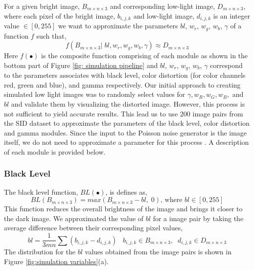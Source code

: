 \documentclass{article}
\begin{document}
For a given bright image, $B_{m\times n\times 3}$ and corresponding low-light image, $D_{m\times n \times 3}$, where each pixel of the bright image, $b_{i, j, k}$ and low-light image, $d_{i, j, k}$ is an integer value $\in [0, 255]$ we want to approximate the parameters $bl$, $w_r$, $w_g$, $w_b$, $\gamma$ of a function $f$ such that, 
$$f(B_{m\times n\times 3} |\; bl, w_r, w_g, w_b, \gamma) \approx D_{m\times n\times 3}$$
Here $f(\bullet)$ is the composite function comprising of each module as shown in the bottom part of Figure \ref{fig: simulation pipeline} and $bl$, $w_r$, $w_g$, $w_b$, $\gamma$ correspond to the parameters associates with black level, color distortion (for color channels red, green and blue), and gamma respectively. Our initial approach to creating simulated low light images was to randomly select values for \(\gamma, w_{R}, w_{G}, w_{B},\) and \(bl\) and validate them by visualizing the distorted image. However, this process is not sufficient to yield accurate results. This lead us to use 200 image pairs from the SID dataset to approximate the parameters of the black level, color distortion and gamma modules. Since the input to the Poisson noise generator is the image itself, we do not need to approximate a parameter for this process \cite{remez2017deep}. A description of each module is provided below. 

\subsubsection{Black Level}
The black level function, $BL(\bullet)$, is defines as, 
$$BL(B_{m\times n\times 3}) = max(B_{m\times n\times 3} - bl,\;0) \text{, where }  bl \in [0, 255]$$
This function reduces the overall brightness of the image and brings it closer to the dark image. We approximated the value of $bl$ for a image pair by taking the average difference between their corresponding pixel values, 
$$bl = \frac{1}{3mn}\sum{(b_{i, j, k} - d_{i, j, k})} \; \;\; b_{i, j, k} \in B_{m\times n\times 3},\;\; d_{i, j, k} \in D_{m\times n\times 3}$$
The distribution for the $bl$ values obtained from the image pairs is shown in Figure \ref{fig:simulation variables}(a).
\end{document}
